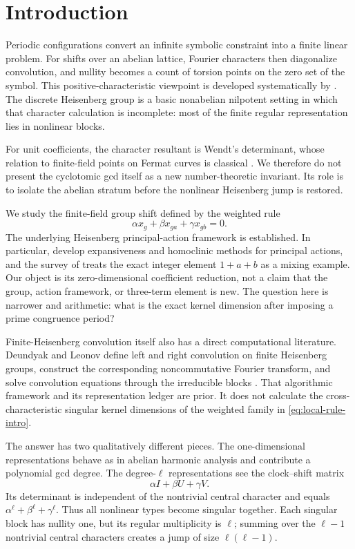 \section{Introduction}

Periodic configurations convert an infinite symbolic constraint into a finite
linear problem.  For shifts over an abelian lattice, Fourier characters then
diagonalize convolution, and nullity becomes a count of torsion points on the
zero set of the symbol.  This positive-characteristic viewpoint is developed
systematically by \citet{Zaidenberg2008}.  The discrete Heisenberg group is a
basic nonabelian nilpotent setting in which that character calculation is
incomplete: most of the finite regular representation lies in nonlinear
blocks.

For unit coefficients, the character resultant is Wendt's determinant, whose
relation to finite-field points on Fermat curves is classical
\citep{FordJha1993}.  We therefore do not present the cyclotomic gcd itself as
a new number-theoretic invariant.  Its role is to isolate the abelian stratum
before the nonlinear Heisenberg jump is restored.

We study the finite-field group shift defined by the weighted rule
\begin{equation}\label{eq:local-rule-intro}
 \alpha x_g+\beta x_{ga}+\gamma x_{gb}=0.
\end{equation}
The underlying Heisenberg principal-action framework is established.  In
particular, \citet{GollSchmidtVerbitskiy2014} develop expansiveness and
homoclinic methods for principal actions, and the survey of
\citet{LindSchmidt2015} treats the exact integer element $1+a+b$ as a mixing
example.  Our object is its zero-dimensional coefficient reduction, not a
claim that the group, action framework, or three-term element is new.  The
question here is narrower and arithmetic: what is the exact kernel dimension
after imposing a prime congruence period?

Finite-Heisenberg convolution itself also has a direct computational
literature.  Deundyak and Leonov define left and right convolution on finite
Heisenberg groups, construct the corresponding noncommutative Fourier transform,
and solve convolution equations through the irreducible blocks
\citep{DeundyakLeonov2016}.  That algorithmic framework and its representation
ledger are prior.  It does not calculate the cross-characteristic singular
kernel dimensions of the weighted family in \eqref{eq:local-rule-intro}.

The answer has two qualitatively different pieces.  The one-dimensional
representations behave as in abelian harmonic analysis and contribute a
polynomial gcd degree.  The degree-$\ell$ representations see the clock--shift
matrix
\[
 \alpha I+\beta U+\gamma V.
\]
Its determinant is independent of the nontrivial central character and equals
$\alpha^\ell+\beta^\ell+\gamma^\ell$.  Thus all nonlinear types become
singular together.  Each singular block has nullity one, but its regular
multiplicity is $\ell$; summing over the $\ell-1$ nontrivial central
characters creates a jump of size $\ell(\ell-1)$.

